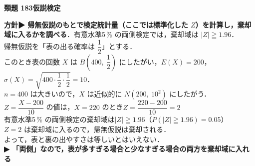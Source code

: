 \documentclass[a4paper,11pt]{ltjsarticle}
\newcommand{\ans}[2]{\Needspace{5\baselineskip}\vspace{6pt}%
  {\sffamily\bfseries 類題 #1\quad #2}\par}
\newcommand{\point}[1]{\textsf{\bfseries ▶ #1}}
\begin{document}
\ans{183}{仮説検定}
\begin{kai}
\textbf{方針}\quad \point{帰無仮説のもとで検定統計量（ここでは標準化した $Z$）を計算し，棄却域に入るかを調べる}．有意水準5\,\% の両側検定では，棄却域は $|Z|\geqq1.96$．\\[2pt]
帰無仮説を「表の出る確率は $\dfrac12$」とする．\\
このとき表の回数 $X$ は $B\left(400,\ \dfrac12\right)$ にしたがい，$E(X)=200$，$\sigma(X)=\sqrt{400\cdot\dfrac12\cdot\dfrac12}=10$．\\
$n=400$ は大きいので，$X$ は近似的に $N(200,\ 10^2)$ にしたがう．\\[2pt]
$Z=\dfrac{X-200}{10}$ の値は，$X=220$ のとき\quad $Z=\dfrac{220-200}{10}=2$\\
有意水準5\,\% の両側検定の棄却域は\quad $|Z|\geqq1.96$（$P(|Z|\geqq1.96)=0.05$）\\[2pt]
$Z=2$ は棄却域に入るので，帰無仮説は棄却される．\\
よって，表と裏の出やすさは等しいとはいえない．\\
\point{「両側」なので，表が多すぎる場合と少なすぎる場合の両方を棄却域に入れる}
\end{kai}
\end{document}

